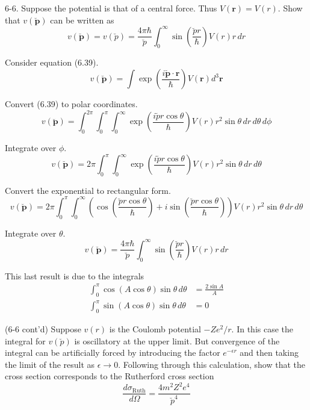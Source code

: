 \documentclass[12pt]{article}
\begin{document}
6-6.
Suppose the potential is that of a central force.
Thus $V(\mathbf r)=V(r)$.
Show that $v(\breve{\mathbf p})$ can be written as
\begin{equation*}
v(\breve{\mathbf p})=v(\breve p)=\frac{4\pi\hbar}{\breve p}
\int_0^\infty\sin\left(\frac{\breve pr}{\hbar}\right)V(r)r\,dr
\tag{6.45}
\end{equation*}

Consider equation (6.39).
\begin{equation*}
v(\breve{\mathbf p})=\int\exp\left(\frac{i\breve{\mathbf p}\cdot\mathbf r}{\hbar}\right)
V(\mathbf r)d^3\mathbf r
\tag{6.39}
\end{equation*}

Convert (6.39) to polar coordinates.
\begin{equation*}
v(\breve{\mathbf p})=\int_0^{2\pi}\int_0^\pi\int_0^\infty
\exp\left(\frac{i\breve pr\cos\theta}{\hbar}\right)
V(r)r^2\sin\theta\,dr\,d\theta\,d\phi
\end{equation*}

Integrate over $\phi$.
\begin{equation*}
v(\breve{\mathbf p})=2\pi\int_0^\pi\int_0^\infty
\exp\left(\frac{i\breve pr\cos\theta}{\hbar}\right)
V(r)r^2\sin\theta\,dr\,d\theta
\end{equation*}

Convert the exponential to rectangular form.
\begin{equation*}
v(\breve{\mathbf p})=2\pi\int_0^\pi\int_0^\infty
\left(\cos\left(\frac{\breve pr\cos\theta}{\hbar}\right)
+i\sin\left(\frac{\breve pr\cos\theta}{\hbar}\right)\right)
V(r)r^2\sin\theta\,dr\,d\theta
\end{equation*}

Integrate over $\theta$.
\begin{equation*}
v(\breve{\mathbf p})=\frac{4\pi\hbar}{\breve p}\int_0^\infty
\sin\left(\frac{\breve pr}{\hbar}\right)
V(r)r\,dr
\end{equation*}

This last result is due to the integrals
\begin{align*}
\int_0^\pi\cos(A\cos\theta)\sin\theta\,d\theta&=\frac{2\sin A}{A}
\\
\int_0^\pi\sin(A\cos\theta)\sin\theta\,d\theta&=0
\end{align*}

(6-6 cont'd)
Suppose $v(r)$ is the Coulomb potential $-Ze^2/r$.
In this case the integral for $v(\breve p)$ is oscillatory at the upper limit.
But convergence of the integral can be artificially forced by
introducing the factor $e^{-\epsilon r}$ and then taking the limit
of the result as $\epsilon\rightarrow0$.
Following through this calculation,
show that the cross section corresponds to the Rutherford cross section
\begin{equation*}
\frac{d\sigma_\text{Ruth}}{d\Omega}
=\frac{4m^2Z^2e^4}{\breve p^4}
\tag{6.46}
\end{equation*}
\end{document}
